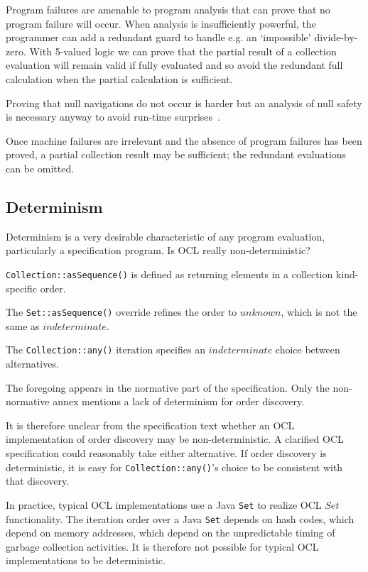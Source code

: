 \documentclass{llncs}
\begin{document}
Program failures are amenable to program analysis that can prove that no program failure will occur. When analysis is insufficiently powerful, the programmer can add a redundant guard to handle e.g. an `impossible' divide-by-zero. With 5-valued logic we can prove that the partial result of a collection evaluation will remain valid if fully evaluated and so avoid the redundant full calculation when the partial calculation is sufficient.

Proving that null navigations do not occur is harder but an analysis of null safety is necessary anyway to avoid run-time surprises~\cite{Safe OCL}.

Once machine failures are irrelevant and the absence of program failures has been proved, a partial collection result may be sufficient; the redundant evaluations can be omitted.

\subsection{Determinism}

Determinism is a very desirable characteristic of any program evaluation, particularly a specification program. Is OCL really non-deterministic?
 
\verb$Collection::asSequence()$ is defined as returning elements in a collection kind-specific order.

The \verb$Set::asSequence()$ override refines the order to $unknown$, which is not the same as $indeterminate$. 

The \verb$Collection::any()$ iteration specifies an $indeterminate$ choice between alternatives. 

The foregoing appears in the normative part of the specification. Only the non-normative annex mentions a lack of determinism for order discovery.

It is therefore unclear from the specification text whether an OCL implementation of order discovery may be non-deterministic. A clarified OCL specification could reasonably take either alternative. If order discovery is deterministic, it is easy for \verb$Collection::any()$'s choice to be consistent with that discovery.

In practice, typical OCL implementations use a Java \verb$Set$ to realize OCL $Set$ functionality. The iteration order over a Java \verb$Set$ depends on hash codes, which depend on memory addresses, which depend on the unpredictable timing of garbage collection activities. It is therefore not possible for typical OCL implementations to be deterministic. 
\end{document}
